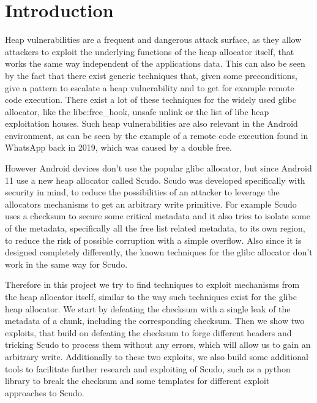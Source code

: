 \documentclass[a4paper,11pt,oneside]{report}
\begin{document}
\maketoc{}

\chapter{Introduction}

Heap vulnerabilities are a frequent and dangerous attack surface, as they allow attackers
to exploit the underlying functions of the heap allocator itself, that works the same way
independent of the applications data. This can also be seen by the fact that there exist
generic techniques that, given some preconditions, give a pattern to escalate a heap
vulnerability and to get for example remote code execution. There exist a lot of these
techniques for the widely used glibc allocator, like the libc:free\_hook, unsafe unlink or
the list of libc heap exploitation houses. Such heap vulnerabilities are also relevant in
the Android environment, as can be seen by the example of a remote code execution found in
WhatsApp back in 2019, which was caused by a double free.~\cite{whatsappRCE}

However Android devices don't use the popular glibc allocator, but since Android 11 use a
new heap allocator called Scudo. Scudo was developed specifically with security in mind,
to reduce the possibilities of an attacker to leverage the allocators mechanisms to get an
arbitrary write primitive. For example Scudo uses a checksum to secure some critical
metadata and it also tries to isolate some of the metadata, specifically all the free list
related metadata, to its own region, to reduce the risk of possible corruption with a
simple overflow. Also since it is designed completely differently, the known techniques
for the glibc allocator don't work in the same way for Scudo.

Therefore in this project we try to find techniques to exploit mechanisms from the heap
allocator itself, similar to the way such techniques exist for the glibc heap
allocator. We start by defeating the checksum with a single leak of the metadata of a
chunk, including the corresponding checksum. Then we show two exploits, that build on
defeating the checksum to forge different headers and tricking Scudo to process them
without any errors, which will allow us to gain an arbitrary write. Additionally to these
two exploits, we also build some additional tools to facilitate further research and
exploiting of Scudo, such as a python library to break the checksum and some templates for
different exploit approaches to Scudo.
\end{document}
